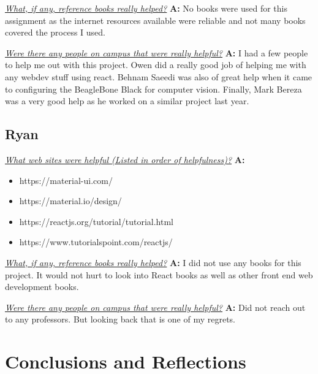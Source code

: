 \documentclass[onecolumn, draftclsnofoot, 10pt, compsoc]{IEEEtran}
\begin{document}
\textit{\underline{What, if any, reference books really helped?}}
\newline\textbf{A:}
No books were used for this assignment as the internet resources available were reliable and not many books covered the process I used. 

\textit{\underline{Were there any people on campus that were really helpful?}}
\newline\textbf{A:}
I had a few people to help me out with this project. Owen did a really good job of helping me with any webdev stuff using react. Behnam Saeedi was also of great help when it came to configuring the BeagleBone Black for computer vision. Finally, Mark Bereza was a very good help as he worked on a similar project last year. 

\subsection{Ryan}
\textit{\underline{What web sites were helpful (Listed in order of helpfulness)?}}
\newline\textbf{A:}
\begin{itemize}
    \item https://material-ui.com/
    \item https://material.io/design/
    \item https://reactjs.org/tutorial/tutorial.html
    \item https://www.tutorialspoint.com/reactjs/ \newline
\end{itemize}

\textit{\underline{What, if any, reference books really helped?}}
\newline\textbf{A:} I did not use any books for this project. It would not hurt to look into React books as well as other front end web development books. \newline 

\textit{\underline{Were there any people on campus that were really helpful?}}
\newline\textbf{A:} Did not reach out to any professors. But looking back that is one of my regrets. \newline 

\section{Conclusions and Reflections}
\end{document}
